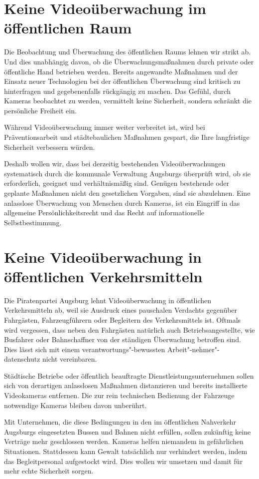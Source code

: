   \section{Keine Videoüberwachung im öffentlichen Raum}
  
  Die Beobachtung und Überwachung des öffentlichen Raums lehnen wir strikt ab. 
  Und dies unabhängig davon, ob die Überwachungsmaßnahmen durch private oder 
  öffentliche Hand betrieben werden. Bereits angewandte Maßnahmen und der 
  Einsatz neuer Technologien bei der öffentlichen Überwachung sind kritisch zu 
  hinterfragen und gegebenenfalls rückgängig zu machen. Das Gefühl, durch 
  Kameras beobachtet zu werden, vermittelt keine Sicherheit, sondern schränkt 
  die persönliche Freiheit ein.
  
  Während Videoüberwachung immer weiter verbreitet ist, wird bei 
  Präventionsarbeit und städtebaulichen Maßnahmen gespart, die Ihre 
  langfristige Sicherheit verbessern würden.
  
  Deshalb wollen wir, dass bei derzeitig bestehenden Videoüberwachungen 
  systematisch durch die kommunale Verwaltung Augsburgs überprüft wird, ob sie 
  erforderlich, geeignet und verhältnismäßig sind. Genügen bestehende oder 
  geplante Maßnahmen nicht den gesetzlichen Vorgaben, sind sie abzulehnen. 
  Eine anlasslose Überwachung von Menschen durch Kameras, ist ein Eingriff in 
  das allgemeine Persönlichkeitsrecht und das Recht auf informationelle 
  Selbstbestimmung. 
  
  \section{Keine Videoüberwachung in öffentlichen Verkehrsmitteln}
  
  Die Piratenpartei Augsburg lehnt Videoüberwachung in öffentlichen 
  Verkehrsmitteln ab, weil sie Ausdruck eines pauschalen Verdachts gegenüber 
  Fahrgästen, Fahrzeugführern oder Begleitern des Verkehrsmittels ist. Oftmals 
  wird vergessen, dass neben den Fahrgästen natürlich auch Betriebsangestellte,
  wie Busfahrer oder Bahnschaffner von der ständigen Überwachung betroffen 
  sind. Dies lässt sich mit einem verantwortungs"-bewussten 
  Arbeit"-nehmer"-daten\-schutz nicht vereinbaren.
  
  Städtische Betriebe oder öffentlich beauftragte Dienstleistungsunternehmen 
  sollen sich von derartigen anlasslosen Maßnahmen distanzieren und bereits 
  installierte Videokameras entfernen. Die zur rein technischen Bedienung der 
  Fahrzeuge notwendige Kameras bleiben davon unberührt.
  
  Mit Unternehmen, die diese Bedingungen in den im öffentlichen Nahverkehr 
  Augsburgs eingesetzten Bussen und Bahnen nicht erfüllen, sollen zukünftig 
  keine Verträge mehr geschlossen werden. Kameras helfen niemandem in 
  gefährlichen Situationen. Stattdessen kann Gewalt tatsächlich nur verhindert 
  werden, indem das Begleitpersonal aufgestockt wird. Dies wollen wir umsetzen 
  und damit für mehr echte Sicherheit sorgen. 

